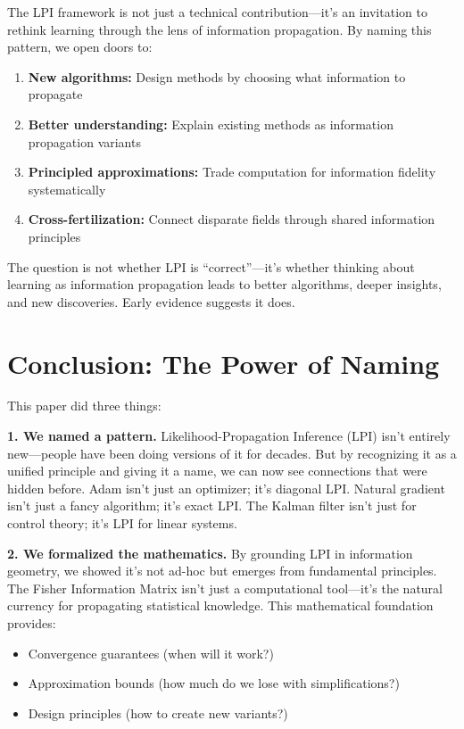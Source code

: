 \documentclass[11pt]{article}
\begin{document}
The LPI framework is not just a technical contribution—it's an invitation to rethink learning through the lens of information propagation. By naming this pattern, we open doors to:

\begin{enumerate}
\item \textbf{New algorithms:} Design methods by choosing what information to propagate
\item \textbf{Better understanding:} Explain existing methods as information propagation variants
\item \textbf{Principled approximations:} Trade computation for information fidelity systematically
\item \textbf{Cross-fertilization:} Connect disparate fields through shared information principles
\end{enumerate}

The question is not whether LPI is ``correct''—it's whether thinking about learning as information propagation leads to better algorithms, deeper insights, and new discoveries. Early evidence suggests it does.

\section{Conclusion: The Power of Naming}

This paper did three things:

\textbf{1. We named a pattern.} Likelihood-Propagation Inference (LPI) isn't entirely new—people have been doing versions of it for decades. But by recognizing it as a unified principle and giving it a name, we can now see connections that were hidden before. Adam isn't just an optimizer; it's diagonal LPI. Natural gradient isn't just a fancy algorithm; it's exact LPI. The Kalman filter isn't just for control theory; it's LPI for linear systems.

\textbf{2. We formalized the mathematics.} By grounding LPI in information geometry, we showed it's not ad-hoc but emerges from fundamental principles. The Fisher Information Matrix isn't just a computational tool—it's the natural currency for propagating statistical knowledge. This mathematical foundation provides:
\begin{itemize}
\item Convergence guarantees (when will it work?)
\item Approximation bounds (how much do we lose with simplifications?)
\item Design principles (how to create new variants?)
\end{itemize}
\end{document}
